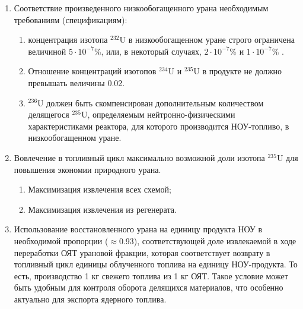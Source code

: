 \begin{enumerate}
  \item Соответствие произведенного низкообогащенного урана необходимым требованиям (спецификациям):
  \begin{enumerate}
    \item концентрация изотопа $^{232}$U в низкообогащенном уране строго ограничена величиной $5\cdot10^{-7}$\%, или, в некоторый случаях, $2\cdot10^{-7}$\% и $1\cdot10^{-7}$\% \cite{smirnovKaskadnyeShemyZadachah2012, c26committeeSpecificationUraniumHexafluoride}.
    \item Отношение концентраций изотопов $^{234}$U и $^{235}$U в продукте не должно превышать величины 0.02.
    \item $^{236}$U должен быть скомпенсирован дополнительным количеством делящегося $^{235}$U, определяемым нейтронно-физическими характеристиками реактора, для которого производится НОУ-топливо, в низкообогащенном уране.
  \end{enumerate}
  \item Вовлечение в топливный цикл максимально возможной доли изотопа $^{235}$U для повышения экономии природного урана.
  \begin{enumerate}
    \item Максимизация извлечения всех схемой;
    \item Максимизация извлечения из регенерата.
  \end{enumerate}
  \item Использование восстановленного урана на единицу продукта НОУ в необходимой пропорции ($\approx$0.93), соответствующей доле извлекаемой в ходе переработки ОЯТ урановой фракции, которая соответствует возврату в топливный цикл единицы облученного топлива на единицу НОУ-продукта. То есть, производство 1 кг свежего топлива из 1 кг ОЯТ. Такое условие может быть удобным для контроля оборота делящихся материалов, что особенно актуально для экспорта ядерного топлива.
\end{enumerate}

